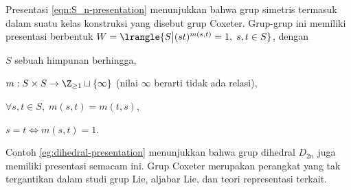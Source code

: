 Presentasi \eqref{eqn:S_n-presentation} menunjukkan bahwa grup simetris termasuk dalam suatu kelas konstruksi yang disebut grup Coxeter. Grup-grup ini memiliki presentasi berbentuk $W = \lrangle{S \big| (st)^{m(s,t)}=1, \; s,t \in S}$, dengan
\begin{compactitem}
	\item $S$ sebuah himpunan berhingga,
	\item $m: S \times S \to \Z_{\geq 1} \sqcup \{\infty\}$ (nilai $\infty$ berarti tidak ada relasi),
	\item $\forall s,t \in S, \; m(s,t)=m(t,s)$,
	\item $s=t \iff m(s,t)=1$.
\end{compactitem}
Contoh \ref{eg:dihedral-presentation} menunjukkan bahwa grup dihedral $D_{2n}$ juga memiliki presentasi semacam ini. Grup Coxeter merupakan perangkat yang tak tergantikan dalam studi grup Lie, aljabar Lie, dan teori representasi terkait. 
